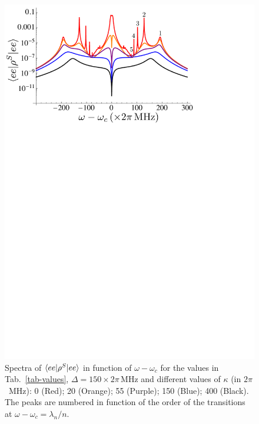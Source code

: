 

\begin{figure}
    \center
    \includegraphics[width=0.75 \textwidth]{Images/chap5/ee_kappa.pdf}
    \caption[ $\prodsc{ee}{\rho^S}{ee}$ in function of $\omega-\omega_c$]{ Spectra of $\prodsc{ee}{\rho^S}{ee}$ in function of $\omega-\omega_c$ for the values in Tab.~\ref{tab-values}, $\Delta=150 \times 2\pi\,\mbox{MHz}$ and different values of $\kappa$ (in $2\pi$~MHz): 0 (Red); 20 (Orange); 55 (Purple); 150 (Blue); 400 (Black). The peaks are numbered in function of the order of the transitions at $\omega-\omega_c=\lambda_n/n$. }
    \label{fig-ee_kappa}
\end{figure}


